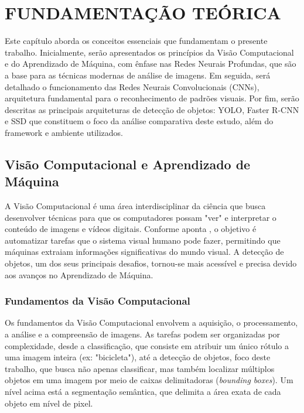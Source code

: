 \chapter{FUNDAMENTAÇÃO TEÓRICA}
\label{cap:fundamentacao}

Este capítulo aborda os conceitos essenciais que fundamentam o presente trabalho. Inicialmente,
serão apresentados os princípios da Visão Computacional e do Aprendizado de Máquina, com ênfase
nas Redes Neurais Profundas, que são a base para as técnicas modernas de análise de imagens. Em
seguida, será detalhado o funcionamento das Redes Neurais Convolucionais (CNNs), arquitetura
fundamental para o reconhecimento de padrões visuais. Por fim, serão descritas as principais
arquiteturas de detecção de objetos: YOLO, Faster R-CNN e SSD que constituem o foco da análise
comparativa deste estudo, além do framework e ambiente utilizados.

\section[Visão Computacional e Aprendizado de Máquina]{Visão Computacional e Aprendizado de\\Máquina}

A Visão Computacional é uma área interdisciplinar da ciência que busca desenvolver técnicas
para que os computadores possam "ver"{} e interpretar o conteúdo de imagens e vídeos digitais.
Conforme aponta , o objetivo é automatizar tarefas que o
sistema visual humano pode fazer, permitindo que máquinas extraiam informações significativas
do mundo visual. A detecção de objetos, um dos seus principais desafios, tornou-se mais
acessível e precisa devido aos avanços no Aprendizado de Máquina.

\subsection{Fundamentos da Visão Computacional}

Os fundamentos da Visão Computacional envolvem a aquisição, o processamento, a análise e a
compreensão de imagens. As tarefas podem ser organizadas por complexidade, desde a
classificação, que consiste em atribuir um único rótulo a uma imagem inteira (ex: "bicicleta"),
até a detecção de objetos, foco deste trabalho, que busca não apenas classificar, mas também
localizar múltiplos objetos em uma imagem por meio de caixas delimitadoras
(\textit{bounding boxes}). Um nível acima está a segmentação semântica, que delimita a área
exata de cada objeto em nível de pixel.

